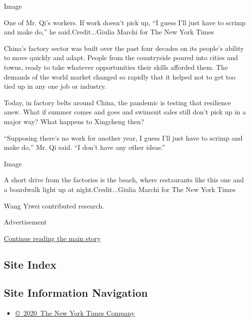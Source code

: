 Image

One of Mr. Qi's workers. If work doesn't pick up, ``I guess I'll just
have to scrimp and make do,'' he said.Credit...Giulia Marchi for The New
York Times

China's factory sector was built over the past four decades on its
people's ability to move quickly and adapt. People from the countryside
poured into cities and towns, ready to take whatever opportunities their
skills afforded them. The demands of the world market changed so rapidly
that it helped not to get too tied up in any one job or industry.

Today, in factory belts around China, the pandemic is testing that
resilience anew. What if summer comes and goes and swimsuit sales still
don't pick up in a major way? What happens to Xingcheng then?

``Supposing there's no work for another year, I guess I'll just have to
scrimp and make do,'' Mr. Qi said. ``I don't have any other ideas.''

Image

A short drive from the factories is the beach, where restaurants like
this one and a boardwalk light up at night.Credit...Giulia Marchi for
The New York Times

Wang Yiwei contributed research.

Advertisement

\protect\hyperlink{after-bottom}{Continue reading the main story}

\hypertarget{site-index}{%
\subsection{Site Index}\label{site-index}}

\hypertarget{site-information-navigation}{%
\subsection{Site Information
Navigation}\label{site-information-navigation}}

\begin{itemize}
\tightlist
\item
  \href{https://help.nytimes.com/hc/en-us/articles/115014792127-Copyright-notice}{©~2020~The
  New York Times Company}
\end{itemize}

